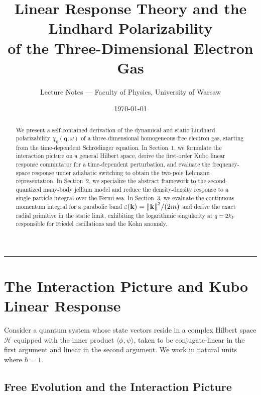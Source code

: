 \documentclass[11pt, a4paper]{article}
\title{\textbf{Linear Response Theory and the Lindhard Polarizability\\of the Three-Dimensional Electron Gas}}
\author{Lecture Notes --- Faculty of Physics, University of Warsaw}
\date{\today}
\numberwithin{equation}{section}
\begin{document}
\maketitle

\begin{abstract}
\noindent
We present a self-contained derivation of the dynamical and static Lindhard polarizability $\chi_0(\mathbf{q}, \omega)$ of a three-dimensional homogeneous free electron gas, starting from the time-dependent Schr\"odinger equation. In Section~1, we formulate the interaction picture on a general Hilbert space, derive the first-order Kubo linear response commutator for a time-dependent perturbation, and evaluate the frequency-space response under adiabatic switching to obtain the two-pole Lehmann representation. In Section~2, we specialize the abstract framework to the second-quantized many-body jellium model and reduce the density-density response to a single-particle integral over the Fermi sea. In Section~3, we evaluate the continuous momentum integral for a parabolic band $\varepsilon(\mathbf{k}) = \norm{\mathbf{k}}^2/(2m)$ and derive the exact radial primitive in the static limit, exhibiting the logarithmic singularity at $q = 2k_F$ responsible for Friedel oscillations and the Kohn anomaly.
\end{abstract}

\tableofcontents
\vspace{1em}
\hrule
\vspace{1.5em}

\section{The Interaction Picture and Kubo Linear Response}

Consider a quantum system whose state vectors reside in a complex Hilbert space $\mathcal{H}$ equipped with the inner product $\langle \phi, \psi \rangle$, taken to be conjugate-linear in the first argument and linear in the second argument. We work in natural units where $\hbar = 1$.

\subsection{Free Evolution and the Interaction Picture}
\end{document}
